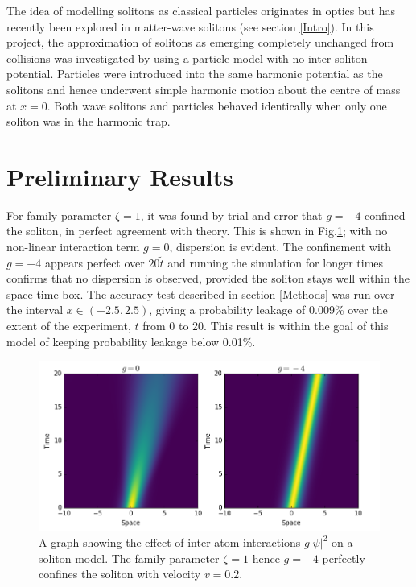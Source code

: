 \documentclass[10pt, twocolumn]{revtex4}    %
\begin{document}
The idea of modelling solitons as classical particles originates in optics but has recently been explored in matter-wave solitons (see section \ref{Intro}). In this project, the approximation of solitons as emerging completely unchanged from collisions was investigated by using a particle model with no inter-soliton potential. Particles were introduced into the same harmonic potential as the solitons and hence underwent simple harmonic motion about the centre of mass at $x=0$. Both wave solitons and particles behaved identically when only one soliton was in the harmonic trap. 


\section{Preliminary Results} \label{Milestone}

 For family parameter $\zeta=1$, it was found by trial and error that $g=-4$ confined the soliton, in perfect agreement with theory. This is shown in Fig.\ref{milestone}; with no non-linear interaction term $g=0$, dispersion is evident. The confinement with $g=-4$ appears perfect over $20\tilde{t}$ and running the simulation for longer times confirms that no dispersion is observed, provided the soliton stays well within the space-time box. The accuracy test described in section \ref{Methods} was run over the interval $x \in (-2.5,2.5)$, giving a probability leakage of 0.009\% over the extent of the experiment, $t$ from 0 to 20. This result is within the goal of this model of keeping probability leakage below 0.01\%. 

\begin{figure}[h]
\includegraphics[width=\columnwidth]{milestonepic.png}
\caption{A graph showing the effect of inter-atom interactions $g |\psi|^2$ on a soliton model. The family 
parameter $\zeta = 1$ hence $g=-4$ perfectly confines the soliton with velocity $v=0.2$.}
\label{milestone}
\end{figure}
\end{document}
